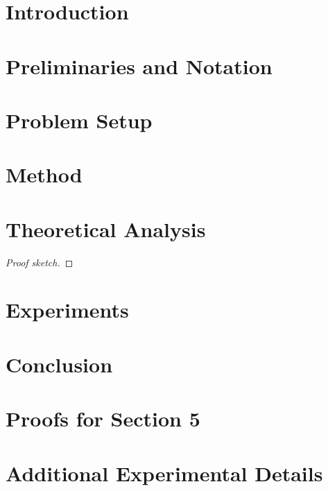 \section{Introduction}

\section{Preliminaries and Notation}

\section{Problem Setup}

\section{Method}

\section{Theoretical Analysis}
\begin{theorem}
\end{theorem}
\begin{proof}[Proof sketch]
\end{proof}

\section{Experiments}

\section{Conclusion}

\appendix
\section{Proofs for Section 5}
\section{Additional Experimental Details}

